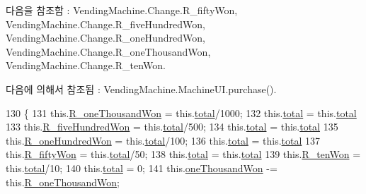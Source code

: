 다음을 참조함 \+:  Vending\+Machine.\+Change.\+R\+\_\+fifty\+Won, Vending\+Machine.\+Change.\+R\+\_\+five\+Hundred\+Won, Vending\+Machine.\+Change.\+R\+\_\+one\+Hundred\+Won, Vending\+Machine.\+Change.\+R\+\_\+one\+Thousand\+Won, Vending\+Machine.\+Change.\+R\+\_\+ten\+Won.



다음에 의해서 참조됨 \+:  Vending\+Machine.\+Machine\+U\+I.\+purchase().


\begin{DoxyCode}
130     \{
131         this.\hyperlink{class_vending_machine_1_1_change_aedcf39060a7c95aa27cce2d74853a16a}{R\_oneThousandWon} = this.\hyperlink{class_vending_machine_1_1_change_aaa54155607801f52da0a520ef638e51d}{total}/1000;
132         this.\hyperlink{class_vending_machine_1_1_change_aaa54155607801f52da0a520ef638e51d}{total} = this.\hyperlink{class_vending_machine_1_1_change_aaa54155607801f52da0a520ef638e51d}{total}%
133         this.\hyperlink{class_vending_machine_1_1_change_a37aebab952ad10a6c3a97d525eb20012}{R\_fiveHundredWon} = this.\hyperlink{class_vending_machine_1_1_change_aaa54155607801f52da0a520ef638e51d}{total}/500;
134         this.\hyperlink{class_vending_machine_1_1_change_aaa54155607801f52da0a520ef638e51d}{total} = this.\hyperlink{class_vending_machine_1_1_change_aaa54155607801f52da0a520ef638e51d}{total}%
135         this.\hyperlink{class_vending_machine_1_1_change_a03ee38bdf926f63d3d537d54b6dd6c85}{R\_oneHundredWon} = this.\hyperlink{class_vending_machine_1_1_change_aaa54155607801f52da0a520ef638e51d}{total}/100;
136         this.\hyperlink{class_vending_machine_1_1_change_aaa54155607801f52da0a520ef638e51d}{total} = this.\hyperlink{class_vending_machine_1_1_change_aaa54155607801f52da0a520ef638e51d}{total}%
137         this.\hyperlink{class_vending_machine_1_1_change_a4e21e933b5ee7b25ebb7318af485de4e}{R\_fiftyWon} = this.\hyperlink{class_vending_machine_1_1_change_aaa54155607801f52da0a520ef638e51d}{total}/50;
138         this.\hyperlink{class_vending_machine_1_1_change_aaa54155607801f52da0a520ef638e51d}{total} = this.\hyperlink{class_vending_machine_1_1_change_aaa54155607801f52da0a520ef638e51d}{total}%
139         this.\hyperlink{class_vending_machine_1_1_change_ade66d07bd5a80d7ea0dfc34704714243}{R\_tenWon} = this.\hyperlink{class_vending_machine_1_1_change_aaa54155607801f52da0a520ef638e51d}{total}/10;
140         this.\hyperlink{class_vending_machine_1_1_change_aaa54155607801f52da0a520ef638e51d}{total} = 0;
141         this.\hyperlink{class_vending_machine_1_1_change_a949998e6d45fdaa880ebfa7ae2e06240}{oneThousandWon} -= this.\hyperlink{class_vending_machine_1_1_change_aedcf39060a7c95aa27cce2d74853a16a}{R\_oneThousandWon};

\end{DoxyCode}
